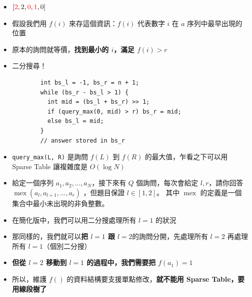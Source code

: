 \documentclass[standalone]{beamer}
\begin{document}
\begin{frame}[fragile]{}
  \begin{itemize}
    \item $[{\color{red} 2}, 2, {\color{red} 0}, {\color{red} 1}, 0]$
    \item 假設我們用 $f(i)$ 來存這個資訊：$f(i)$ 代表數字 $i$ 在 $a$ 序列中最早出現的位置
    \item 原本的詢問就等價，\textbf{找到最小的 $i$，滿足 $f(i) > r$}
    \item 二分搜尋！
      \begin{verbatim}
        int bs_l = -1, bs_r = n + 1;
        while (bs_r - bs_l > 1) {
          int mid = (bs_l + bs_r) >> 1;
          if (query_max(0, mid) > r) bs_r = mid;
          else bs_l = mid;
        }
        // answer stored in bs_r
      \end{verbatim}
    \item \texttt{query\_max(L, R)} 是詢問 $f(L)$ 到 $f(R)$ 的最大值，乍看之下可以用 Sparse Table 讓複雜度是 $O(\log N)$ 
  \end{itemize}
\end{frame}

\begin{frame}[fragile]{}
  \begin{itemize}
    \item 
      \begin{problem}
        給定一個序列 $a_1,a_2,\dots,a_N$，接下來有 $Q$ 個詢問，每次會給定 $l, r$，請你回答 $\operatorname{mex}(a_l,a_{l+1},\dots,a_r)$ ，但題目保證 $l \in [1, 2]$。
        其中 $\operatorname{mex}$ 的定義是一個集合中最小未出現的非負整數。
      \end{problem}
    \item 在簡化版中，我們可以用二分搜處理所有 $l = 1$ 的狀況
    \item 那同樣的，我們就可以\textbf{把 $l = 1$ 跟 $l = 2$}的詢問分開，先處理所有 $l = 2$ 再處理所有 $l = 1$（個別二分搜）
    \item \textbf{但從 $l = 2$ 移動到 $l = 1$ 的過程中，我們需要把 $f(a_1) = 1$}
    \item 所以，維護 $f()$ 的資料結構要支援單點修改，\textbf{就不能用 Sparse Table，要用線段樹了}
  \end{itemize}
\end{frame}
\end{document}
